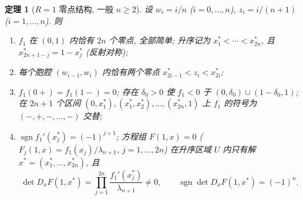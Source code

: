 \documentclass[UTF8]{ctexart}
\newtheorem{theorem}{定理}[section]
\begin{document}
\begin{theorem}[$R=1$ 零点结构, 一般 $n\ge2$]\label{thm:r1}
设 $w_i=i/n$ ($i=0,\dots,n$), $z_i=i/(n+1)$ ($i=1,\dots,n$). 则
\begin{enumerate}
	\item[(i)] $f_1$ 在 $(0,1)$ 内恰有 $2n$ 个零点, 全部简单; 升序记为
	$x_1^*<\cdots<x_{2n}^*$, 且 $x_{2n+1-j}^*=1-x_j^*$ (反射对称);
	\item[(ii)] 每个胞腔 $(w_{i-1},w_i)$ 内恰有两个零点
	$x_{2i-1}^*<z_i<x_{2i}^*$;
	\item[(iii)] $f_1(0+)=f_1(1-)=0$; 存在 $\delta_0>0$ 使 $f_1<0$ 于
	$(0,\delta_0)\cup(1-\delta_0,1)$; 在 $2n+1$ 个区间
	$(0,x_1^*),(x_1^*,x_2^*),\dots,(x_{2n}^*,1)$ 上 $f_1$ 的符号为
	$(-,+,-,\dots,-)$ 交替;
	\item[(iv)] $\operatorname{sgn}f_1'(x_j^*)=(-1)^{j+1}$; 方程组
	$F(1,x)=0$ ($F_j(1,x)=f_1(x_j)/\lambda_{n+1}$, $j=1,\dots,2n$) 在升序区域
	$U$ 内只有解 $x^*=(x_1^*,\dots,x_{2n}^*)$, 且
	\begin{equation*}
		\det D_xF(1,x^*)=\prod_{j=1}^{2n}\frac{f_1'(x_j^*)}{\lambda_{n+1}}
		\neq0,\qquad
		\operatorname{sgn}\det D_xF(1,x^*)=(-1)^n.
	\end{equation*}
\end{enumerate}
\end{theorem}
\end{document}
